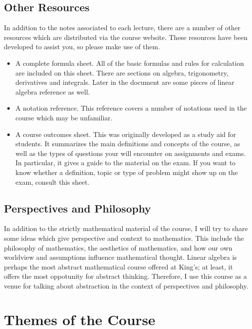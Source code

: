 \documentclass[fleqn]{report}
\begin{document}
\subsection{Other Resources}
\label{resources}

In addition to the notes associated to each lecture, there are
a number of other resources which are distributed via
the course website. These resources have been developed to
assist you, so please make use of them. 

\begin{itemize}
\item A complete formula sheet. All of the basic formulas and
rules for calculation are included on this sheet. There are
sections on algebra, trigonometry, derivatives and integrals.
Later in the document are some pieces of linear algebra
reference as well.
\item A notation reference. This reference covers a number of
notations used in the course which may be unfamiliar. 
\item A course outcomes sheet. This was originally
developed as a study aid for students. It summarizes the main
definitions and concepts of the course, as well as the types
of questions your will encounter on assignments and exams. In
particular, it gives a guide to the material on the exam. If
you want to know whether a definition, topic or type of
problem might show up on the exam, consult this sheet. 
\end{itemize}

\subsection{Perspectives and Philosophy}
\label{philosophy}

In addition to the strictly mathematical material of the
course, I will try to share some ideas which give perspective
and context to mathematics. This include the philosophy of
mathematics, the aesthetics of mathematics, and how our own worldview and
assumptions influence mathematical thought. Linear algebra is
perhaps the most abstract mathematical course offered at
King's; at least, it offers the most oppotunity for
abstract thinking. Therefore, I use this course as a venue for
talking about abstraction in the context of perspectives and
philosophy.

\section{Themes of the Course}
\label{themes}
\end{document}
